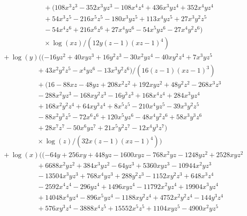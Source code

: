 \documentclass[letter,11pt,DIV=12,abstract=true,numbers=noenddot,titlepage=false,twocolumn=false,draft=false]{scrartcl}
\begin{document}
\begin{equation}
\begin{split}
      & \qquad \qquad \qquad \quad + (108 x^3 z^3 - 352 x^3 y z^3 - 108 x^4 z^4 + 436 x^3 y z^4 + 352 x^4 y z^4\\
      & \qquad \qquad \qquad \quad + 54 x^3 z^5 - 216 x^5 z^5 - 180 x^3 y z^5 + 113 x^4 y z^5 + 27 x^3 y^2 z^5\\
      & \qquad \qquad \qquad \quad - 54 x^4 z^6 + 216 x^6 z^6 + 27 x^4 y z^6 - 54 x^5 y z^6 - 27 x^4 y^2 z^6)\\
      & \qquad \qquad \qquad \quad \times \log(xz)/(12 y (z-1) (x z-1)^4)\\
& \quad + \log(y) ((-16 y z^2 + 40 x y z^3 + 16 y^2 z^3 - 30 x^2 y z^4 - 40 x y^2 z^4 + 7 x^3 y z^5\\
      & \qquad \qquad \qquad + 43 x^2 y^2 z^5 - x^4 y z^6 - 13 x^3 y^2 z^6)/(16 (z-1) (x z-1)^3)\\
      & \qquad \qquad \qquad + (16 - 88 x z - 48 y z + 208 x^2 z^2 + 192 x y z^2 + 48 y^2 z^2 - 268 x^3 z^3\\
      & \qquad \qquad \qquad - 288 x^2 y z^3 - 168 x y^2 z^3 - 16 y^3 z^3 + 168 x^4 z^4 + 284 x^3 y z^4\\
      & \qquad \qquad \qquad + 168 x^2 y^2 z^4 + 64 x y^3 z^4 + 8 x^5 z^5 - 210 x^4 y z^5 - 39 x^3 y^2 z^5\\
      & \qquad \qquad \qquad - 88 x^2 y^3 z^5 - 72 x^6 z^6 + 120 x^5 y z^6 - 48 x^4 y^2 z^6 + 58 x^3 y^3 z^6\\
      & \qquad \qquad \qquad + 28 x^7 z^7 - 50 x^6 y z^7 + 21 x^5 y^2 z^7 - 12 x^4 y^3 z^7)\\
      & \qquad \qquad \qquad \times \log(z)/(32 x (z-1) (x z-1)^4))\\
& \quad + \log(x) ((-64 y + 256 x y + 448 y z - 1600 x y z - 768 x^2 y z - 1248 y z^2 + 2528 x y z^2\\
      & \qquad \qquad \qquad + 6688 x^2 y z^2 + 384 x^3 y z^2 - 64 y z^3 + 5360 x y z^3 - 10944 x^2 y z^3\\
      & \qquad \qquad \qquad - 13504 x^3 y z^3 + 768 x^4 y z^3 + 288 y^2 z^3 - 1152 x y^2 z^3 + 648 x^3 z^4\\
      & \qquad \qquad \qquad - 2592 x^4 z^4 - 296 y z^4 + 1496 x y z^4 - 11792 x^2 y z^4 + 19904 x^3 y z^4\\
      & \qquad \qquad \qquad + 14048 x^4 y z^4 - 896 x^5 y z^4 - 1188 x y^2 z^4 + 4752 x^2 y^2 z^4 - 144 y^3 z^4\\
      & \qquad \qquad \qquad + 576 x y^3 z^4 - 3888 x^4 z^5 + 15552 x^5 z^5 + 1104 x y z^5 - 4900 x^2 y z^5\\

\end{split}
\end{equation}
\end{document}
